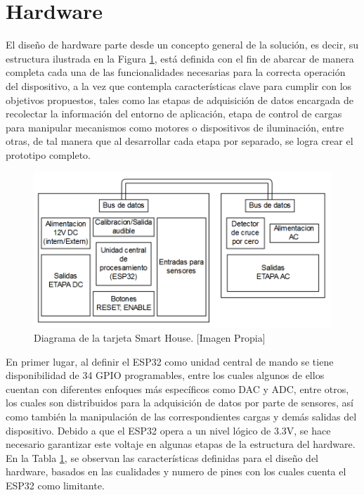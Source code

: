\section{Hardware}\label{sec:hw}

El diseño de hardware parte desde un concepto general de la solución, es decir, su estructura ilustrada en la Figura \ref{fig:tar}, está definida con el fin de abarcar de manera completa cada una de las funcionalidades necesarias para la correcta operación del dispositivo, a la vez que contempla características clave para cumplir con los objetivos propuestos, tales como las etapas de adquisición de datos encargada de recolectar la información del entorno de aplicación, etapa de control de cargas para manipular mecanismos como motores o dispositivos de iluminación, entre otras, de tal manera que al desarrollar cada etapa por separado, se logra crear el prototipo completo.\\

\begin{figure}[H]
	\centering
	\caption[Diagrama de la tarjeta Smart House.]{Diagrama de la tarjeta Smart House.  [Imagen Propia]}
	\label{fig:tar}
	\includegraphics[width=0.7\linewidth]{Imagenes/Tarjeta}
\end{figure}

En primer lugar, al definir el ESP32 como unidad central de mando se tiene disponibilidad de 34 GPIO programables, entre los cuales algunos de ellos cuentan con diferentes enfoques más específicos como DAC y ADC, entre otros, los cuales son distribuidos para la adquisición de datos por parte de sensores, así como también la manipulación de las correspondientes cargas y demás salidas del dispositivo. Debido a que el ESP32 opera a un nivel lógico de 3.3V, se hace necesario garantizar este voltaje en algunas etapas de la estructura del hardware.\\

En la Tabla \ref{fig:tar}, se observan las características definidas para el diseño del hardware, basados en las cualidades y numero de pines con los cuales cuenta el ESP32 como limitante.\\


